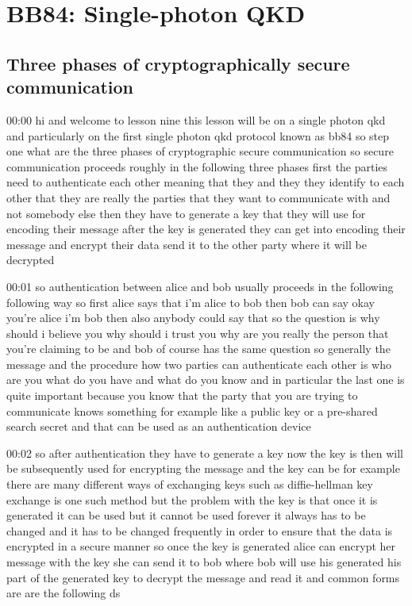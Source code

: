 \chapter{BB84: Single-photon QKD}


\section{Three phases of cryptographically secure communication}

00:00
hi and welcome to lesson nine this lesson will be on a single photon qkd
and particularly on the first single photon qkd protocol known as bb84
so step one what are the three phases of cryptographic secure communication
so secure communication proceeds roughly in the following
three phases first the parties need to authenticate each other meaning that
they and they they identify to each other that they are really the parties
that they want to communicate with and not somebody else
then they have to generate a key that they will use for encoding their message
after the key is generated they can get into encoding their message and encrypt
their data send it to the other party where it will be decrypted

00:01
so authentication between alice and bob usually proceeds in the following
following way so first alice says that i'm alice to bob then bob can say okay
you're alice i'm bob then also anybody could say that so the question
is why should i believe you why should i trust you why are you really the person
that you're claiming to be and bob of course has the same question
so generally the message and the procedure how
two parties can authenticate each other is
who are you what do you have and what do you know
and in particular the last one is quite important
because you know that the party that you are trying to communicate
knows something for example like a public key or a pre-shared search secret
and that can be used as an authentication device

00:02
so after authentication they have to generate a key now the key is then
will be subsequently used for encrypting the
message and the key can be for example there are many different
ways of exchanging keys such as diffie-hellman key exchange
is one such method but the problem with the key is that once it is generated it
can be used but it cannot be used forever it always has to be changed
and it has to be changed frequently in order to ensure
that the data is encrypted in a secure manner so once the key is generated alice
can encrypt her message with the key she can send it to bob
where bob will use his generated his part of the generated key
to decrypt the message and read it and common forms are are the following ds


